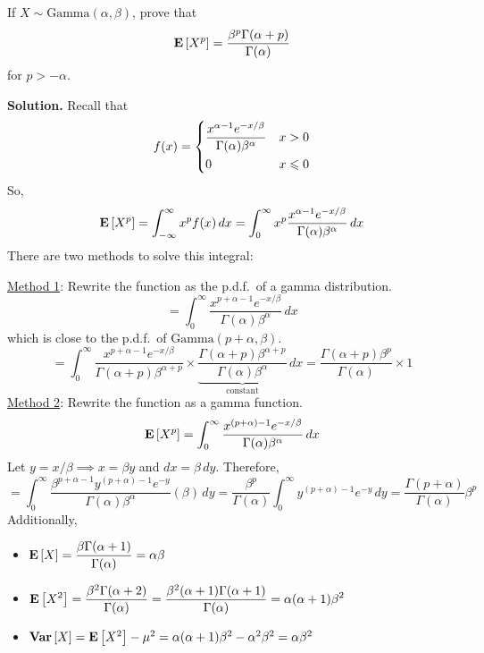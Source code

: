 \begin{Example}{}{}
    If $ X \sim \text{Gamma}(\alpha,\beta) $, prove that
    \[ \bm{\mathrm{E}}\left[X^p\right]=\frac{\beta^p\Gamma(\alpha+p)}{\Gamma(\alpha)}  \]
    for $ p>-\alpha $.

    \textbf{Solution.} Recall that
    \[ f(x)=\begin{dcases}
            \frac{x^{\alpha-1}e^{-x/\beta}}{\Gamma(\alpha)\beta^\alpha} & x>0          \\
            0                                                           & x\leqslant 0
        \end{dcases} \]
    So,
    \[ \bm{\mathrm{E}}\left[X^p\right]=\int_{-\infty}^{\infty} x^p f(x)\, d{x}
        =\int_{0}^{\infty} x^p \frac{x^{\alpha-1}e^{-x/\beta}}{\Gamma(\alpha)\beta^\alpha}\, d{x}
    \]
    There are two methods to solve this integral:

    \underline{Method 1}: Rewrite the function as the p.d.f.\ of a gamma
    distribution.
    \[ =\int_{0}^{\infty} \frac{x^{p+\alpha-1}e^{-x/\beta}}{\Gamma(\alpha)\beta^\alpha} \, d{x}  \]
    which is close to the p.d.f.\ of $ \text{Gamma}(p+\alpha,\beta) $.
    \[ =\int_{0}^{\infty} \frac{x^{p+\alpha-1}e^{-x/\beta}}{\Gamma(\alpha+p)\beta^{\alpha+p}}\times
        \underbrace{\frac{\Gamma(\alpha+p)\beta^{\alpha+p}}{\Gamma(\alpha)\beta^\alpha}}_{\text{constant}}  \, d{x}=
        \frac{\Gamma(\alpha+p)\beta^p}{\Gamma(\alpha)}\times 1   \]
    \underline{Method 2}: Rewrite the function as a gamma function.
    \[ \bm{\mathrm{E}}\left[X^p\right]=\int_{0}^{\infty} \frac{x^{(p+\alpha)-1} e^{-x/\beta}}{\Gamma(\alpha)\beta^\alpha} \, d{x} \]
    Let $ y=x/\beta \implies x=\beta y$ and $ dx=\beta\,dy $. Therefore,
    \[ =\int_{0}^{\infty} \frac{\beta^{p+\alpha-1}y^{(p+\alpha)-1}e^{-y}}{\Gamma(\alpha)\beta^\alpha} (\beta)\, d{y}
        =\frac{\beta^p}{\Gamma(\alpha)}\int_{0}^{\infty} y^{(p+\alpha)-1}e^{-y}\, d{y}
        =\frac{\Gamma(p+\alpha)}{\Gamma(\alpha)}\beta^p     \]
    Additionally,
    \begin{itemize}
        \item $ \displaystyle \bm{\mathrm{E}}\left[X\right]= \frac{\beta\Gamma(\alpha+1)}{\Gamma(\alpha)} =\alpha\beta $
        \item $ \displaystyle \bm{\mathrm{E}}\left[X^2\right]= \frac{\beta^2\Gamma(\alpha+2)}{\Gamma(\alpha)}=\frac{\beta^2(\alpha+1)\Gamma(\alpha+1)}{\Gamma(\alpha)}=
                  \alpha(\alpha+1)\beta^2   $
        \item $ \bm{\mathrm{Var}}\left[X\right]=\bm{\mathrm{E}}\left[X^2\right]-\mu^2=\alpha(\alpha+1)\beta^2-\alpha^2\beta^2=\alpha\beta^2 $
    \end{itemize}
\end{Example}
\setcounter{section}{9}
